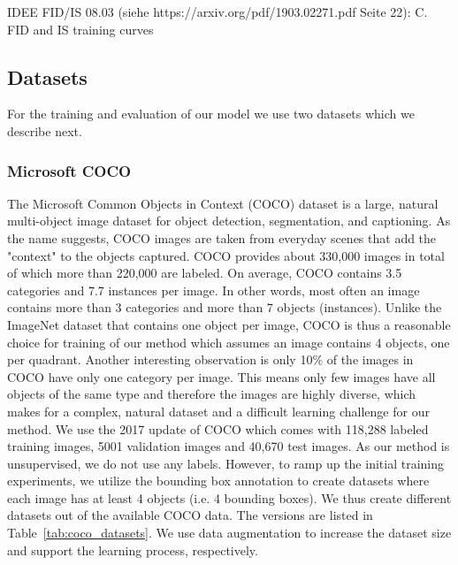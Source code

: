 \documentclass[12pt,a4paper]{article}
\begin{document}
\par IDEE FID/IS 08.03 (siehe https://arxiv.org/pdf/1903.02271.pdf Seite 22): C. FID and IS training curves
    
\subsection{Datasets}
For the training and evaluation of our model we use two datasets which we describe next.

\subsubsection{Microsoft COCO}
The Microsoft Common Objects in Context (COCO) dataset \cite{MsCoco} is a large, natural multi-object image dataset for object detection, segmentation, and captioning.
As the name suggests, COCO images are taken from everyday scenes that add the "context" to the objects captured. COCO provides about 330,000 images in total of which more than 220,000 are labeled. On average, COCO contains 3.5 categories and 7.7 instances per image. In other words, most often an image contains more than 3 categories and more than 7 objects (instances). Unlike the ImageNet dataset that contains one object per image, COCO is thus a reasonable choice for training of our method which assumes an image contains 4 objects, one per quadrant. Another interesting observation is only 10\% of the images in COCO have only one category per image. This means only few images have all objects of the same type and therefore the images are highly diverse, which makes for a complex, natural dataset and a difficult learning challenge for our method. We use the 2017 update of COCO which comes with 118,288 labeled training images, 5001 validation images and 40,670 test images. As our method is unsupervised, we do not use any labels. However, to ramp up the initial training experiments, we utilize the bounding box annotation to create datasets where each image has at least 4 objects (i.e. 4 bounding boxes). We thus create different datasets out of the available COCO data. The versions are listed in Table~\ref{tab:coco_datasets}. We use data augmentation to increase the dataset size and support the learning process, respectively.
\end{document}
